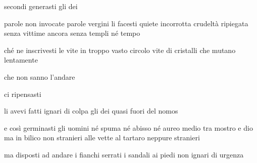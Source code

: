 \clearpage


\begin{poem}
	\begin{stanza}
		secondi generasti gli dei
	\end{stanza}

	\begin{stanza}
		parole non invocate\verseline
		parole vergini li facesti\verseline
		quiete incorrotta\verseline
		crudeltà ripiegata\verseline
		senza vittime ancora\verseline
		senza templi\verseline
		né tempo
	\end{stanza}

	\begin{stanza}
		ché ne inscrivesti le vite\verseline
		in troppo vasto circolo\verseline
		vite di cristalli che mutano\verseline
		lentamente
	\end{stanza}

	\begin{stanza}
		che non sanno l’andare
	\end{stanza}
\end{poem}

\clearpage


\begin{poem}
	\begin{stanza}
		ci ripensasti
	\end{stanza}

	\begin{stanza}
		li avevi fatti ignari\verseline
		di colpa gli dei\verseline
		quasi fuori del nomos
	\end{stanza}

	\begin{stanza}
		e così germinasti\verseline
		gli uomini\verseline
		né spuma né abisso\verseline
		né aureo medio\verseline
		tra mostro e dio\verseline
		ma in bilico\verseline
		non stranieri alle vette\verseline
		al tartaro neppure stranieri
	\end{stanza}

	\begin{stanza}
		ma disposti ad andare\verseline
		i fianchi serrati\verseline
		i sandali ai piedi\verseline
		non ignari di urgenza
	\end{stanza}
\end{poem}

\clearpage



